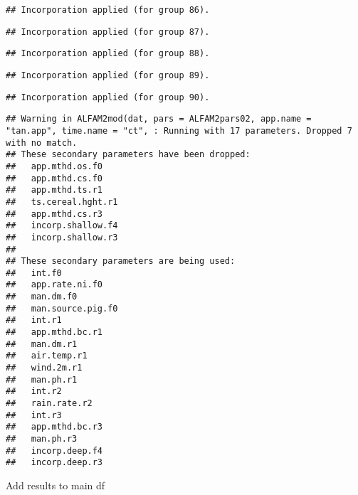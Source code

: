 \documentclass[
  landscape]{article}
\newenvironment{Shaded}{\begin{snugshade}}{\end{snugshade}}
\newcommand{\DecValTok}[1]{\textcolor[rgb]{0.00,0.00,0.81}{#1}}
\newcommand{\FunctionTok}[1]{\textcolor[rgb]{0.00,0.00,0.00}{#1}}
\newcommand{\NormalTok}[1]{#1}
\newcommand{\OtherTok}[1]{\textcolor[rgb]{0.56,0.35,0.01}{#1}}
\newcommand{\SpecialCharTok}[1]{\textcolor[rgb]{0.00,0.00,0.00}{#1}}
\begin{document}
\begin{verbatim}
## Incorporation applied (for group 86).
\end{verbatim}

\begin{verbatim}
## Incorporation applied (for group 87).
\end{verbatim}

\begin{verbatim}
## Incorporation applied (for group 88).
\end{verbatim}

\begin{verbatim}
## Incorporation applied (for group 89).
\end{verbatim}

\begin{verbatim}
## Incorporation applied (for group 90).
\end{verbatim}

\begin{verbatim}
## Warning in ALFAM2mod(dat, pars = ALFAM2pars02, app.name = "tan.app", time.name = "ct", : Running with 17 parameters. Dropped 7 with no match.
## These secondary parameters have been dropped:
##   app.mthd.os.f0
##   app.mthd.cs.f0
##   app.mthd.ts.r1
##   ts.cereal.hght.r1
##   app.mthd.cs.r3
##   incorp.shallow.f4
##   incorp.shallow.r3
## 
## These secondary parameters are being used:
##   int.f0
##   app.rate.ni.f0
##   man.dm.f0
##   man.source.pig.f0
##   int.r1
##   app.mthd.bc.r1
##   man.dm.r1
##   air.temp.r1
##   wind.2m.r1
##   man.ph.r1
##   int.r2
##   rain.rate.r2
##   int.r3
##   app.mthd.bc.r3
##   man.ph.r3
##   incorp.deep.f4
##   incorp.deep.r3
\end{verbatim}

Add results to main df

\begin{Shaded}
\end{Shaded}
\end{document}
